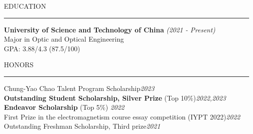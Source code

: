 \documentclass{resume} %
\renewenvironment{rSection}[1]{
\sectionskip
\textcolor{CarnegieMellonRed}{\MakeUppercase{#1}}
\sectionlineskip
\hrule
\begin{list}{}{
\setlength{\leftmargin}{1.5em}
}
\item[]
}{
\end{list}
}
\begin{document}
\begin{rSection}{Education}
{\bf University of Science and Technology of China} \hfill {\em (2021 - Present)} 
\\ Major in Optic and Optical Engineering\hfill
\\ GPA: 3.88/4.3 (87.5/100) \hfill
\end{rSection}


\begin{rSection}{HONORS} \itemsep -2pt
{Chung-Yao Chao Talent Program Scholarship}\hfill {\em 2023} \\
{\textbf{Outstanding Student Scholarship, Silver Prize} (Top 10\%)}\hfill {\em 2022,2023} \\
{\textbf{Endeavor Scholarship} (Top 5\%)} \hfill {\em 2022} \\
{First Prize in the electromagnetism course essay competition (IYPT 2022)}\hfill {\em 2022} \\
{Outstanding Freshman Scholarship, Third prize}\hfill {\em 2021}
\end{rSection}
\end{document}
